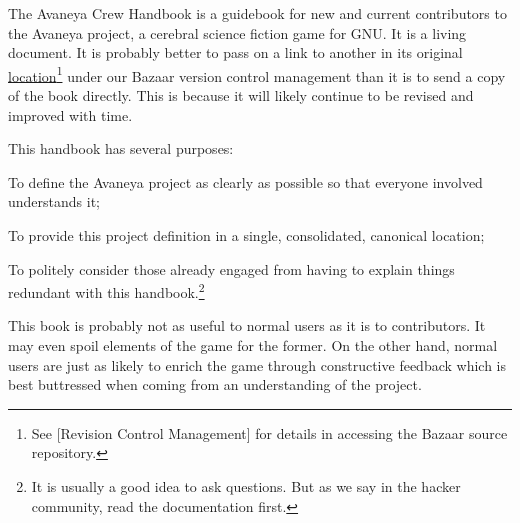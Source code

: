 

The Avaneya Crew Handbook is a guidebook for new and current contributors to the Avaneya project, a cerebral science fiction game for GNU. It is a living document. It is probably better to pass on a link to another in its original \href{http://bazaar.launchpad.net/~avaneya/avaneya/trunk/view/head:/Documentation/Contributors/Handbook/Avaneya\%20Crew\%20Handbook.pdf}{location}\footnote[]{See [Revision Control Management] for details in accessing the Bazaar source repository.} under our Bazaar version control management than it is to send a copy of the book directly. This is because it will likely continue to be revised and improved with time.

This handbook has several purposes:

\startitemize[R]
\item
To define the Avaneya project as clearly as possible so that everyone involved understands it;

\item
To provide this project definition in a single, consolidated, canonical location;

\item
To politely consider those already engaged from having to explain things redundant with this handbook.\footnote[rtfm]{It is usually a good idea to ask questions. But as we say in the hacker community, read the documentation first.}
\stopitemize

This book is probably not as useful to normal users as it is to contributors. It may even spoil elements of the game for the former. On the other hand, normal users are just as likely to enrich the game through constructive feedback which is best buttressed when coming from an understanding of the project.

\StopChapter

